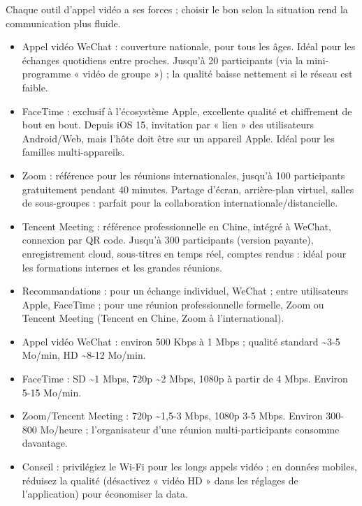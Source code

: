 
Chaque outil d'appel vidéo a ses forces ; choisir le bon selon la situation rend la communication plus fluide.

\begin{itemize}
  \item Appel vidéo WeChat : couverture nationale, pour tous les âges. Idéal pour les échanges quotidiens entre proches. Jusqu'à 20 participants (via la mini-programme « vidéo de groupe ») ; la qualité baisse nettement si le réseau est faible.
  \item FaceTime : exclusif à l'écosystème Apple, excellente qualité et chiffrement de bout en bout. Depuis iOS 15, invitation par « lien » des utilisateurs Android/Web, mais l'hôte doit être sur un appareil Apple. Idéal pour les familles multi-appareils.
  \item Zoom : référence pour les réunions internationales, jusqu'à 100 participants gratuitement pendant 40 minutes. Partage d'écran, arrière-plan virtuel, salles de sous-groupes : parfait pour la collaboration internationale/distancielle.
  \item Tencent Meeting : référence professionnelle en Chine, intégré à WeChat, connexion par QR code. Jusqu'à 300 participants (version payante), enregistrement cloud, sous-titres en temps réel, comptes rendus : idéal pour les formations internes et les grandes réunions.
  \item Recommandations : pour un échange individuel, WeChat ; entre utilisateurs Apple, FaceTime ; pour une réunion professionnelle formelle, Zoom ou Tencent Meeting (Tencent en Chine, Zoom à l'international).
\end{itemize}


\begin{itemize}
  \item Appel vidéo WeChat : environ 500 Kbps à 1 Mbps ; qualité standard \textasciitilde{}3-5 Mo/min, HD \textasciitilde{}8-12 Mo/min.
  \item FaceTime : SD \textasciitilde{}1 Mbps, 720p \textasciitilde{}2 Mbps, 1080p à partir de 4 Mbps. Environ 5-15 Mo/min.
  \item Zoom/Tencent Meeting : 720p \textasciitilde{}1,5-3 Mbps, 1080p 3-5 Mbps. Environ 300-800 Mo/heure ; l'organisateur d'une réunion multi-participants consomme davantage.
  \item Conseil : privilégiez le Wi-Fi pour les longs appels vidéo ; en données mobiles, réduisez la qualité (désactivez « vidéo HD » dans les réglages de l'application) pour économiser la data.
\end{itemize}

